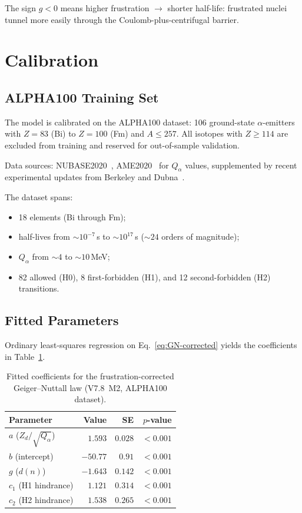 \documentclass[12pt,a4paper,twocolumn]{revtex4-2}
\newcommand{\Qalpha}{Q_\alpha}
\newcommand{\Zd}{Z_d}
\newcommand{\dn}{d(n)}
\begin{document}
The sign $g < 0$ means higher frustration $\to$ shorter
half-life: frustrated nuclei tunnel more easily through the
Coulomb-plus-centrifugal barrier.

\section{Calibration}
\label{sec:calibration}

\subsection{ALPHA100 Training Set}

The model is calibrated on the ALPHA100 dataset: 106 ground-state
$\alpha$-emitters with $Z = 83$ (Bi) to $Z = 100$ (Fm) and
$A \leq 257$.  All isotopes with $Z \geq 114$ are excluded from
training and reserved for out-of-sample validation.

Data sources: NUBASE2020~\cite{NUBASE2020},
AME2020~\cite{AME2020} for $\Qalpha$ values, supplemented by
recent experimental updates from Berkeley and
Dubna~\cite{Gates2024}.

The dataset spans:
\begin{itemize}
\item 18 elements (Bi through Fm);
\item half-lives from $\sim 10^{-7}$\,s to $\sim 10^{17}$\,s
  ($\sim 24$ orders of magnitude);
\item $\Qalpha$ from $\sim 4$ to $\sim 10$\,MeV;
\item 82 allowed (H0), 8 first-forbidden (H1), and
  12 second-forbidden (H2) transitions.
\end{itemize}

\subsection{Fitted Parameters}

Ordinary least-squares regression on Eq.~\eqref{eq:GN-corrected}
yields the coefficients in Table~\ref{tab:coefficients}.

\begin{table}[h]
\centering
\caption{Fitted coefficients for the frustration-corrected
  Geiger--Nuttall law (V7.8~M2, ALPHA100 dataset).}
\label{tab:coefficients}
\begin{tabular}{@{}lrrr@{}}
\toprule
Parameter & Value & SE & $p$-value \\
\midrule
$a$ ($\Zd/\sqrt{\Qalpha}$) & $1.593$ & $0.028$ & $<0.001$ \\
$b$ (intercept)             & $-50.77$ & $0.91$ & $<0.001$ \\
$g$ ($\dn$)                 & $-1.643$ & $0.142$ & $<0.001$ \\
$c_1$ (H1 hindrance)        & $1.121$ & $0.314$ & $<0.001$ \\
$c_2$ (H2 hindrance)        & $1.538$ & $0.265$ & $<0.001$ \\
\bottomrule
\end{tabular}
\end{table}
\end{document}
